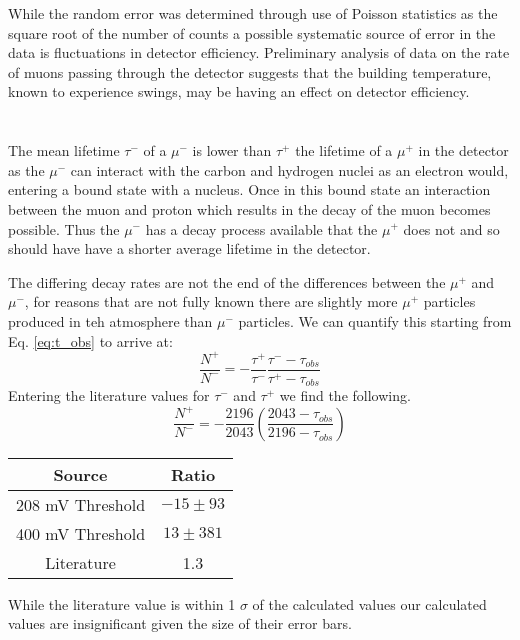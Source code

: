 \documentclass[11pt,letterpaper]{article}
\begin{document}
While the random error was determined through use of Poisson statistics as the square root of the number of counts a possible systematic source of error in the data is fluctuations in detector efficiency. Preliminary analysis of data on the rate of muons passing through the detector suggests that the building temperature, known to experience swings, may be having an effect on detector efficiency.
\section{} %
The mean lifetime $\tau^-$ of a $\mu^-$ is lower than $\tau^+$ the lifetime of a $\mu^+$ in the detector as the $\mu^-$ can interact with the carbon and hydrogen nuclei as an electron would, entering a bound state with a nucleus. Once in this bound state an interaction between the muon and proton which results in the decay of the muon becomes possible. Thus the $\mu^-$ has a decay process available that the $\mu^+$ does not and so should have have a shorter average lifetime in the detector. 

The differing decay rates are not the end of the differences between the $\mu^+$ and $\mu^-$, for reasons that are not fully known there are slightly more $\mu^+$ particles produced in teh atmosphere than $\mu^-$ particles. We can quantify this starting from Eq. \ref{eq:t_obs} to arrive at:
\begin{equation}
\label{eq:ratio}
    \frac{N^+}{N^-} = -\frac{\tau^+}{\tau^-}\frac{\tau^--\tau_{obs}}{\tau^+-\tau_{obs}}
\end{equation}
Entering the literature values for $\tau^-$ and $\tau^+$ we find the following.
\begin{equation}
\frac{N^+}{N^-} =-\frac{2196}{2043}\left(\frac{2043-\tau_{obs}}{2196-\tau_{obs}}\right)
\end{equation}
\begin{center}
	\begin{tabular}{|c|c|}\hline
		Source & Ratio \\ \hline\hline
		208 mV Threshold &$-15 \pm 93$   \\ \hline
		400 mV Threshold & $13 \pm 381$ \\ \hline
        Literature & 1.3  \\ \hline
	\end{tabular}
\end{center}
While the literature value is within 1 $\sigma$ of the calculated values our calculated values are insignificant given the size of their error bars.
\end{document}
